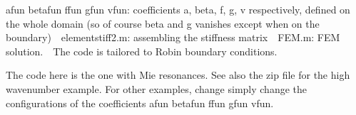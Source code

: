  afun betafun ffun gfun vfun: coefficients a, beta, f, g, v respectively, defined on the whole domain (so of course beta and g vanishes except when on the boundary)\
\
elementstiff2.m: assembling the stiffness matrix\
\
FEM.m: FEM solution.\
\
The code is tailored to Robin boundary conditions. 

The code here is the one with Mie resonances. See also the zip file for the high wavenumber example. For other examples, change simply change the configurations of the coefficients afun betafun ffun gfun vfun.
